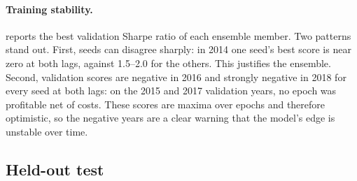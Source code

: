 \paragraph{Training stability.}  reports the best validation Sharpe ratio of
each ensemble member. Two patterns stand out. First, seeds can disagree sharply: in 2014 one seed's
best score is near zero at both lags, against 1.5--2.0 for the others. This justifies the
ensemble. Second, validation scores are negative in 2016 and strongly negative in 2018 for every
seed at both lags: on the 2015 and 2017 validation years, no epoch was profitable net of costs. These scores are maxima over epochs and therefore optimistic, so the
negative years are a clear warning that the model's edge is unstable over time.

\begin{table}[ht]
\centering
\caption{Best validation net Sharpe ratio of each ensemble member, by trading year. Each model
trains on data from the given start to two years before the trading year and is validated on the
year before it.}
\label{tab:deepfolds}
\small

\end{table}

\subsection{Held-out test}
\label{sec:oos}

